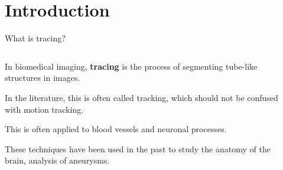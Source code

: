 \documentclass[9pt, aspectratio=169]{beamer}
\begin{document}
\section{Introduction}

\begin{frame}
    {What is tracing?}
    \begin{columns}
        \begin{column}{.7\textwidth}
            In biomedical imaging, \textbf{tracing} is the process of segmenting tube-like structures in images.

            In the literature, this is often called tracking, which should not be confused with motion tracking.

            This is often applied to blood vessels and neuronal processes.

            \pause

            These techniques have been used in the past to study the anatomy of the brain, analysis of aneurysms.
        \end{column}
        \begin{column}{.3\textwidth}
        \end{column}
    \end{columns}
\end{frame}
\end{document}
